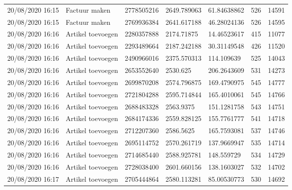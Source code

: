 \begin{tiny}
\begin{longtable}{lllllll}
    20/08/2020 16:15 & Factuur maken         & 2778505216        & 2649.789063 & 61.84638862           & 526              & 14591            \\
    20/08/2020 16:15 & Factuur maken         & 2769936384        & 2641.617188 & 46.28024136           & 526              & 14595            \\
    20/08/2020 16:16 & Artikel toevoegen     & 2280357888        & 2174.71875  & 14.46523617           & 415              & 11077            \\
    20/08/2020 16:16 & Artikel toevoegen     & 2293489664        & 2187.242188 & 30.31149548           & 426              & 11520            \\
    20/08/2020 16:16 & Artikel toevoegen     & 2490966016        & 2375.570313 & 114.109639            & 525              & 14043            \\
    20/08/2020 16:16 & Artikel toevoegen     & 2653552640        & 2530.625    & 206.2643609           & 531              & 14273            \\
    20/08/2020 16:16 & Artikel toevoegen     & 2699870208        & 2574.796875 & 169.4790975           & 545              & 14777            \\
    20/08/2020 16:16 & Artikel toevoegen     & 2721804288        & 2595.714844 & 165.4010061           & 545              & 14766            \\
    20/08/2020 16:16 & Artikel toevoegen     & 2688483328        & 2563.9375   & 151.1281758           & 543              & 14751            \\
    20/08/2020 16:16 & Artikel toevoegen     & 2684174336        & 2559.828125 & 155.7761777           & 541              & 14718            \\
    20/08/2020 16:16 & Artikel toevoegen     & 2712207360        & 2586.5625   & 165.7593081           & 537              & 14746            \\
    20/08/2020 16:16 & Artikel toevoegen     & 2695114752        & 2570.261719 & 137.9669947           & 535              & 14714            \\
    20/08/2020 16:16 & Artikel toevoegen     & 2714685440        & 2588.925781 & 148.559729            & 534              & 14729            \\
    20/08/2020 16:16 & Artikel toevoegen     & 2728038400        & 2601.660156 & 138.1603027           & 532              & 14702            \\
    20/08/2020 16:17 & Artikel toevoegen     & 2705444864        & 2580.113281 & 85.00530773           & 530              & 14692            \\

\end{longtable}
\end{tiny}
